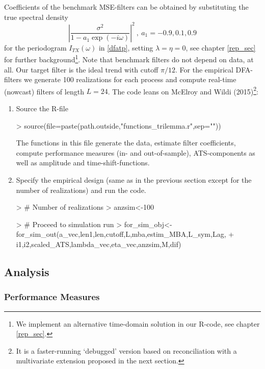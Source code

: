 \documentclass[a4paper]{book}
\begin{document}
Coefficients of the benchmark MSE-filters can be obtained by substituting the true spectral density
\[\left|\frac{\sigma^2}{1-a_1\exp(-i\omega)}\right|^2~,~a_1=-0.9,0.1,0.9\]
for the periodogram $I_{TX}(\omega)$ in \ref{dfatp}, setting $\lambda=\eta=0$, see chapter \ref{rep_sec} for further background\footnote{We implement an alternative time-domain solution in our R-code, see chapter \ref{rep_sec}.}. Note that benchmark filters do not depend on data, at all. Our target filter is the ideal trend with cutoff $\pi/12$.  
For the empirical DFA-filters we generate 100 realizations for each process and compute real-time (nowcast) filters of length $L=24$. The code leans on McElroy and Wildi (2015)\footnote{It is a faster-running `debugged' version based on reconciliation with a multivariate extension proposed in the next section.}:
\begin{enumerate}
\item Source the R-file
\begin{Schunk}
\begin{Sinput}
> source(file=paste(path.outside,"functions_trilemma.r",sep=""))
\end{Sinput}
\end{Schunk}
The functions in this file generate the data, estimate filter coefficients, compute performance measures (in- and out-of-sample), ATS-components as well as amplitude and time-shift-functions. 
\item Specify the empirical design (same as in the previous section except for the number of realizations) and run the code. 
\begin{Schunk}
\begin{Sinput}
> # Number of realizations
> anzsim<-100
\end{Sinput}
\end{Schunk}
\begin{Schunk}
\begin{Sinput}
> # Proceed to simulation run
> for_sim_obj<-for_sim_out(a_vec,len1,len,cutoff,L,mba,estim_MBA,L_sym,Lag,
+                       i1,i2,scaled_ATS,lambda_vec,eta_vec,anzsim,M,dif)
\end{Sinput}
\end{Schunk}
\end{enumerate}

\subsection{Analysis}


\subsubsection{Performance Measures}
\end{document}
